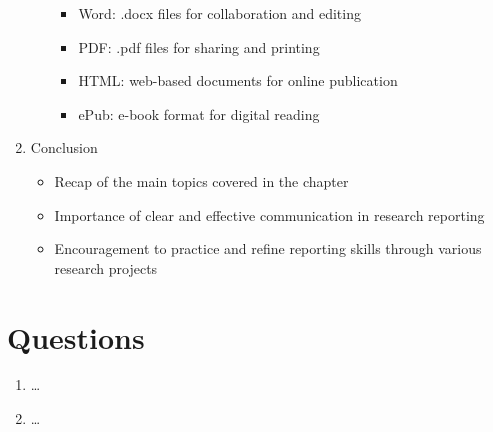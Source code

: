 \documentclass[
  letterpaper,
]{latex/krantz}
\providecommand{\tightlist}{%
  \setlength{\itemsep}{0pt}\setlength{\parskip}{0pt}}\usepackage{longtable,booktabs,array}
\begin{document}
\begin{enumerate}
\begin{itemize}
    \begin{itemize}
    \tightlist
    \item
      Word: .docx files for collaboration and editing
    \item
      PDF: .pdf files for sharing and printing
    \item
      HTML: web-based documents for online publication
    \item
      ePub: e-book format for digital reading
    \end{itemize}
  \end{itemize}
\item
  Conclusion

  \begin{itemize}
  \tightlist
  \item
    Recap of the main topics covered in the chapter
  \item
    Importance of clear and effective communication in research
    reporting
  \item
    Encouragement to practice and refine reporting skills through
    various research projects
  \end{itemize}
\end{enumerate}

\hypertarget{questions-11}{%
\section*{Questions}\label{questions-11}}


\begin{tcolorbox}[enhanced jigsaw, colbacktitle=quarto-callout-note-color!10!white, arc=.35mm, toprule=.15mm, breakable, colframe=quarto-callout-note-color-frame, bottomrule=.15mm, opacitybacktitle=0.6, coltitle=black, titlerule=0mm, colback=white, toptitle=1mm, bottomtitle=1mm, title=\textcolor{quarto-callout-note-color}{\faInfo}\hspace{0.5em}{Conceptual questions}, rightrule=.15mm, leftrule=.75mm, opacityback=0, left=2mm]

\begin{enumerate}
\def\labelenumi{\arabic{enumi}.}
\tightlist
\item
  \ldots{}
\item
  \ldots{}
\end{enumerate}

\end{tcolorbox}
\end{document}
